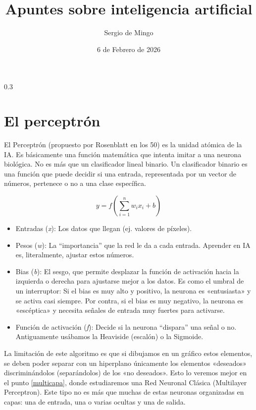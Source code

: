 \documentclass[a4paper,11pt]{article}
\title{Apuntes sobre inteligencia artificial}
\author{Sergio de Mingo}
\date{6 de Febrero de 2026}
\renewenvironment{equation}{\begin{equation*}}{\end{equation*}}
\let\oldequation\equation
\let\endoldequation\endequation
\renewenvironment{equation}
  {\vspace{0.5em}\oldequation}
  {\endoldequation\vspace{0.5em}}
\begin{document}
\maketitle

\begin{spacing}{0.3}
\tableofcontents
\end{spacing}

\clearpage


\section{El perceptrón}

El Perceptrón (propuesto por Rosenblatt en los 50) es la unidad atómica
de la IA. Es básicamente una función matemática que intenta imitar a una
neurona biológica. No es más que un clasificador lineal binario. Un
clasificador binario es una función que puede decidir si una entrada,
representada por un vector de números, pertenece o no a una clase
específica.

\begin{equation}
y = f\!\left( \sum_{i=1}^{n} w_i x_i + b \right)
\end{equation}

\begin{itemize}
\item
  Entradas (\emph{x}): Los datos que llegan (ej. valores de píxeles).
\item
  Pesos (\emph{w}): La ``importancia'' que la red le da a cada entrada.
  Aprender en IA es, literalmente, ajustar estos números.
\item
  Bias (\emph{b}): El sesgo, que permite desplazar la función de
  activación hacia la izquierda o derecha para ajustarse mejor a los
  datos. Es como el umbral de un interruptor: Si el bias es muy alto y
  positivo, la neurona es «entusiasta» y se activa casi siempre. Por
  contra, si el bias es muy negativo, la neurona es «escéptica» y
  necesita señales de entrada muy fuertes para activarse.
\item
  Función de activación (\emph{f}): Decide si la neurona ``dispara'' una
  señal o no. Antiguamente usábamos la Heaviside (escalón) o la
  Sigmoide.
\end{itemize}

La limitación de este algoritmo es que si dibujamos en un gráfico estos
elementos, se deben poder separar con un hiperplano únicamente los
elementos «deseados» discriminándolos (separándolos) de los «no
deseados». Esto lo veremos mejor en el punto \ref{multicapa}, donde
estudiaremos una Red Neuronal Clásica (Multilayer Perceptron). Este tipo
no es más que muchas de estas neuronas organizadas en capas: una de
entrada, una o varias ocultas y una de salida.
\end{document}
